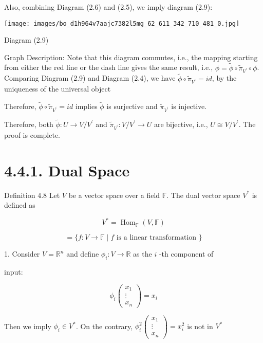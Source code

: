 \documentclass[11pt]{article}
\begin{document}
Also, combining Diagram (2.6) and (2.5), we imply diagram (2.9):

\begin{center}
\texttt{[image: images/bo\_d1h964v7aajc7382l5mg\_62\_611\_342\_710\_481\_0.jpg]}
\end{center}
\hspace*{3em} 

Diagram (2.9)

Graph Description: Note that this diagram commutes, i.e., the mapping starting from either the red line or the dash line gives the same result, i.e., \(\phi  = \widetilde{\phi } \circ  {\widetilde{\pi }}_{{V}^{\prime }} \circ  \phi\). Comparing Diagram (2.9) and Diagram (2.4), we have \(\widetilde{\phi } \circ  {\widetilde{\pi }}_{{V}^{\prime }} = {id}\), by the uniqueness of the universal object

Therefore, \(\widetilde{\phi } \circ  {\widetilde{\pi }}_{{V}^{\prime }} = {id}\) implies \(\widetilde{\phi }\) is surjective and \({\widetilde{\pi }}_{{V}^{\prime }}\) is injective.

Therefore, both \(\widetilde{\phi } : U \rightarrow  V/{V}^{\prime }\) and \({\widetilde{\pi }}_{{V}^{\prime }} : V/{V}^{\prime } \rightarrow  U\) are bijective, i.e., \(U \cong  V/{V}^{\prime }\). The proof is complete.

\section*{4.4.1. Dual Space}

Definition 4.8 Let \(V\) be a vector space over a field \(\mathbb{F}\). The dual vector space \({V}^{ * }\) is defined as

\[
{V}^{ * } = {\operatorname{Hom}}_{\mathbb{F}}\left( {V,\mathbb{F}}\right)
\]

\[
= \{ f : V \rightarrow  \mathbb{F} \mid  f\text{ is a linear transformation }\}
\]

1. Consider \(V = {\mathbb{R}}^n\) and define \({\phi }_{i} : V \rightarrow  \mathbb{R}\) as the \(i\) -th component of

input:

\[
{\phi }_{i}\left( \begin{matrix} {x}_1 \\  \vdots \\  {x}_n \end{matrix}\right)  = {x}_{i}
\]

Then we imply \({\phi }_{i} \in  {V}^{ * }\). On the contrary, \({\phi }_{i}^2\left( \begin{matrix} {x}_1 \\  \vdots \\  {x}_n \end{matrix}\right)  = {x}_{i}^2\) is not in \({V}^{ * }\)
\end{document}
